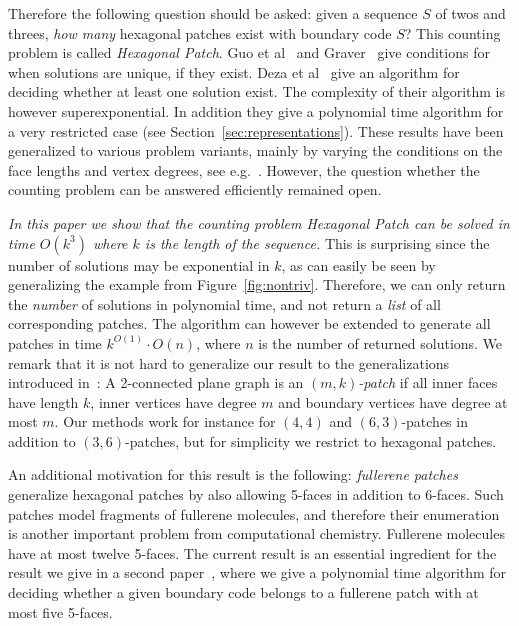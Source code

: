 \documentclass{llncs}
\begin{document}
Therefore the following question should be asked: given a sequence $S$ of twos and threes, {\em how many} hexagonal patches exist with boundary code $S$? This counting problem is called {\em Hexagonal Patch}. Guo et al~\cite{GHZ02} and Graver~\cite{Gra03} give conditions for when solutions are unique, if they exist. Deza et al~\cite{DFG01} give an algorithm for deciding whether at least one solution exist. The complexity of their algorithm is however superexponential.
In addition they give a polynomial time algorithm for a very restricted case (see Section~\ref{sec:representations}).
These results have been generalized to various problem variants, mainly by varying the conditions on the face lengths and vertex degrees, see e.g.~\cite{DDS08,BC09,BDN05,BGJ09}. However, the question whether the counting problem can be answered efficiently remained open. 


\medskip

{\em In this paper we show that the counting problem Hexagonal Patch can be solved in time $O(k^3)$ where $k$ is the length of the sequence.} This is surprising since the number of solutions may be exponential in $k$, as can easily be seen by generalizing the example from Figure~\ref{fig:nontriv}.
Therefore, we can only return the {\em number} of solutions in polynomial time, and not return a {\em list} of all corresponding patches. The algorithm can however be extended to generate all patches in time $k^{O(1)}\cdot O(n)$, where $n$ is the number of returned solutions.
We remark that it is not hard to generalize our result to the generalizations introduced in~\cite{BDN05}:
A 2-connected plane graph is an {\em $(m,k)$-patch} if all inner faces have length $k$, inner vertices have degree $m$ and boundary vertices have degree at most $m$. 
Our methods work for instance for $(4,4)$ and $(6,3)$-patches in addition to $(3,6)$-patches, but for simplicity we restrict to hexagonal patches.




An additional motivation for this result is the following: {\em fullerene patches} generalize hexagonal patches by also allowing 5-faces in addition to 6-faces. Such patches model fragments of fullerene molecules, and therefore their enumeration is another important problem from computational chemistry. Fullerene molecules have at most twelve 5-faces. 
The current result is an essential ingredient for the result we give in a second paper~\cite{BB2}, where we give a polynomial time algorithm for deciding whether a given boundary code belongs to a fullerene patch with at most five 5-faces.
\end{document}
